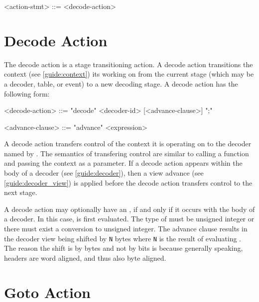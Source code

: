 \begin{minip}
\begin{grammar}
<action-stmt> ::=
<decode-action>
\end{grammar}
\end{minip}


\section{Decode Action} \label{guide:decode_action}

The decode action is a stage transitioning action. A decode action transitions the context (see \ref{guide:context}) its working on from the current stage (which may be a decoder, table, or event) to a new decoding stage. A decode action has the following form:

\begin{minip}
\begin{grammar}
<decode-action> ::=
"decode" <decoder-id> [<advance-clause>] ";"

<advance-clause> ::= "advance" <expression>
\end{grammar}
\end{minip}

A decode action transfers control of the context it is operating on to the decoder named by . The semantics of transfering control are similar to calling a function and passing the context as a parameter. If a decode action appears within the body of a decoder (see \ref{guide:decoder}), then a view advance (see \ref{guide:decoder_view}) is applied before the decode action transfers control to the next stage.

A decode action may optionally have an , if and only if it occurs with the body of a decoder. In this case,  is first evaluated. The type of  must be unsigned integer or there must exist a conversion to unsigned integer. The advance clause results in the decoder view being shifted by \texttt{N} bytes where \texttt{N} is the result of evaluating . The reason the shift is by bytes and not by bits is because generally speaking, headers are word aligned, and thus also byte aligned.

\section{Goto Action} \label{guide:goto}

